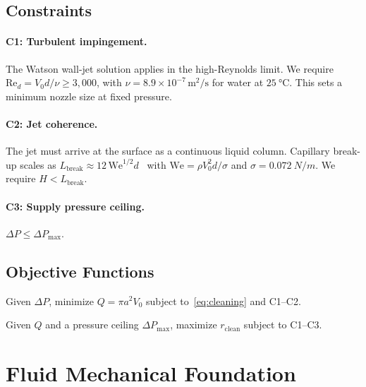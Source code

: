 \documentclass[aps,prfluids,reprint,amsmath,amssymb,floatfix]{revtex4-2}
\newcommand{\Rey}{\mathrm{Re}}
\newcommand{\We}{\mathrm{We}}
\begin{document}
\subsection{Constraints}

\paragraph{C1: Turbulent impingement.}
The Watson wall-jet solution applies in the high-Reynolds limit. We require
$\Rey_d = V_0 d/\nu \geq 3{,}000$, with $\nu = 8.9\times 10^{-7}\,\mathrm{m^2/s}$
for water at $\SI{25}{\degreeCelsius}$. This sets a minimum nozzle size at
fixed pressure.

\paragraph{C2: Jet coherence.}
The jet must arrive at the surface as a continuous liquid column. Capillary
break-up scales as $L_\mathrm{break} \approx 12\,\We^{1/2} d$~\citep{Lefebvre1988}
with $\We = \rho V_0^2 d/\sigma$ and $\sigma = \SI{0.072}{N/m}$. We require
$H < L_\mathrm{break}$.

\paragraph{C3: Supply pressure ceiling.}
$\Delta P \leq \Delta P_\mathrm{max}$.

\subsection{Objective Functions}

\begin{description}[leftmargin=10pt]
\item[P1 (water minimization, fixed $\Delta P$):]
Given $\Delta P$, minimize $Q = \pi a^2 V_0$ subject to~\eqref{eq:cleaning}
and C1--C2.
\item[P2 (coverage maximization, fixed $Q$):]
Given $Q$ and a pressure ceiling $\Delta P_\mathrm{max}$, maximize
$r_\mathrm{clean}$ subject to C1--C3.
\end{description}

\section{Fluid Mechanical Foundation}
\label{sec:fluids}
\end{document}
